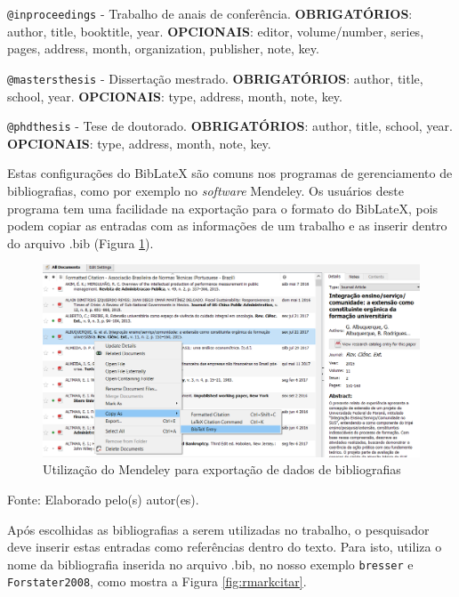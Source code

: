 \documentclass[12pt,portuguese,oneside]{book}
\begin{document}
\texttt{@inproceedings} - Trabalho de anais de conferência.
\textbf{OBRIGATÓRIOS}: author, title, booktitle, year.
\textbf{OPCIONAIS}: editor, volume/number, series, pages, address,
month, organization, publisher, note, key.

\texttt{@mastersthesis} - Dissertação mestrado. \textbf{OBRIGATÓRIOS}:
author, title, school, year. \textbf{OPCIONAIS}: type, address, month,
note, key.

\texttt{@phdthesis} - Tese de doutorado. \textbf{OBRIGATÓRIOS}: author,
title, school, year. \textbf{OPCIONAIS}: type, address, month, note,
key.

Estas configurações do BibLateX são comuns nos programas de
gerenciamento de bibliografias, como por exemplo no \emph{software}
Mendeley. Os usuários deste programa tem uma facilidade na exportação
para o formato do BibLateX, pois podem copiar as entradas com as
informações de um trabalho e as inserir dentro do arquivo .bib (Figura
\ref{fig:rmarkmendeley}).

\begin{figure}[H]

{\centering \includegraphics[width=0.8\linewidth]{rmarkmendeley} 

}

\caption{Utilização do Mendeley para exportação de dados de bibliografias}\label{fig:rmarkmendeley}
\end{figure}

Fonte: Elaborado pelo(s) autor(es).

Após escolhidas as bibliografias a serem utilizadas no trabalho, o
pesquisador deve inserir estas entradas como referências dentro do
texto. Para isto, utiliza o nome da bibliografia inserida no arquivo
.bib, no nosso exemplo \texttt{bresser} e \texttt{Forstater2008}, como
mostra a Figura \ref{fig:rmarkcitar}.
\end{document}

